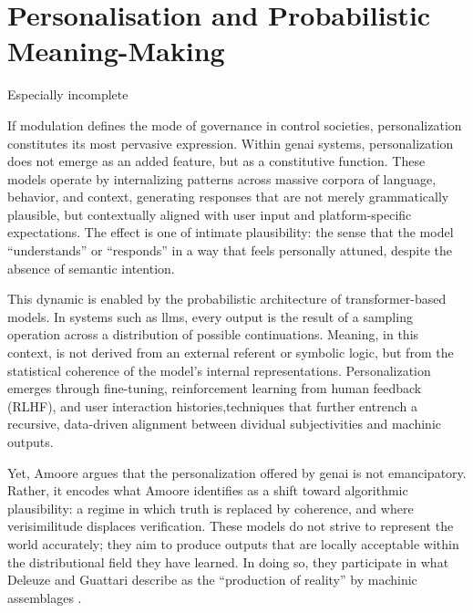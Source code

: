 \section{Personalisation and Probabilistic Meaning-Making}

\begin{orangebox}
	Especially incomplete
\end{orangebox}



If modulation defines the mode of governance in control societies, personalization constitutes its most pervasive expression. Within \gls{genai} systems, personalization does not emerge as an added feature, but as a constitutive function. These models operate by internalizing patterns across massive corpora of language, behavior, and context, generating responses that are not merely grammatically plausible, but contextually aligned with user input and platform-specific expectations. The effect is one of intimate plausibility: the sense that the model “understands” or “responds” in a way that feels personally attuned, despite the absence of semantic intention.

This dynamic is enabled by the probabilistic architecture of transformer-based models. In systems such as \glspl{llm}, every output is the result of a sampling operation across a distribution of possible continuations. Meaning, in this context, is not derived from an external referent or symbolic logic, but from the statistical coherence of the model's internal representations. Personalization emerges through fine-tuning, reinforcement learning from human feedback (RLHF), and user interaction histories,techniques that further entrench a recursive, data-driven alignment between dividual subjectivities and machinic outputs.




Yet, Amoore \parencite{amoore2024} argues that the personalization offered by \gls{genai} is not emancipatory. Rather, it encodes what Amoore \parencite{amoore2024} identifies as a shift toward algorithmic plausibility: a regime in which truth is replaced by coherence, and where verisimilitude displaces verification. These models do not strive to represent the world accurately; they aim to produce outputs that are locally acceptable within the distributional field they have learned. In doing so, they participate in what Deleuze and Guattari describe as the “production of reality” by machinic assemblages \parencite{deleuze1983}.

